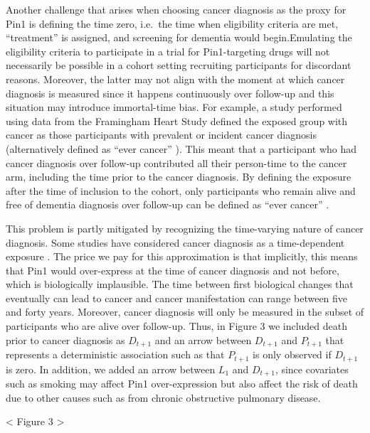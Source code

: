 \documentclass[
]{book}
\begin{document}
Another challenge that arises when choosing cancer diagnosis as the proxy for Pin1 is defining the time zero, i.e.~the time when eligibility criteria are met, ``treatment'' is assigned, and screening for dementia would begin\autocite{hernanInmortal2016}.Emulating the eligibility criteria to participate in a trial for Pin1-targeting drugs will not necessarily be possible in a cohort setting recruiting participants for discordant reasons. Moreover, the latter may not align with the moment at which cancer diagnosis is measured since it happens continuously over follow-up and this situation may introduce immortal-time bias\autocite{hernanInmortal2016}. For example, a study performed using data from the Framingham Heart Study \autocite{driver2012} defined the exposed group with cancer as those participants with prevalent or incident cancer diagnosis (alternatively defined as ``ever cancer'' \autocite{hanson2016}). This meant that a participant who had cancer diagnosis over follow-up contributed all their person-time to the cancer arm, including the time prior to the cancer diagnosis. By defining the exposure after the time of inclusion to the cohort, only participants who remain alive and free of dementia diagnosis over follow-up can be defined as ``ever cancer'' \autocite[\textcite{hernanInmortal2016}]{anderson1983}.

This problem is partly mitigated by recognizing the time-varying nature of cancer diagnosis. Some studies have considered cancer diagnosis as a time-dependent exposure \autocite{white2013,hanson2016,bowles2017}. The price we pay for this approximation is that implicitly, this means that Pin1 would over-express at the time of cancer diagnosis and not before, which is biologically implausible. The time between first biological changes that eventually can lead to cancer and cancer manifestation can range between five and forty years\autocite{nadler2013}. Moreover, cancer diagnosis will only be measured in the subset of participants who are alive over follow-up. Thus, in Figure 3 we included death prior to cancer diagnosis as \(D_{t+1}\) and an arrow between \(D_{t+1}\) and \(P_{t+1}\) that represents a deterministic association such as that \(P_{t+1}\) is only observed if \(D_{t+1}\) is zero. In addition, we added an arrow between \(L_1\) and \(D_{t+1}\), since covariates such as smoking may affect Pin1 over-expression but also affect the risk of death due to other causes such as from chronic obstructive pulmonary disease.

\textless{} Figure 3 \textgreater{}
\end{document}
